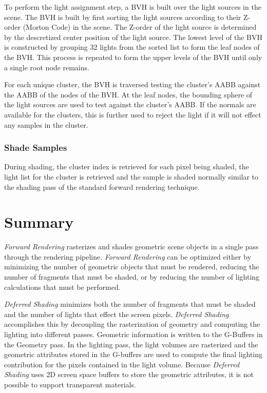 To perform the light assignment step, a BVH is built over the light sources in the scene. The BVH is built by first sorting the light sources according to their Z-order (Morton Code) in the scene. The Z-order of the light source is determined by the descretized center position of the light source. The lowest level of the BVH is constructed by grouping 32 lights from the sorted list to form the leaf nodes of the BVH. This process is repeated to form the upper levels of the BVH until only a single root node remains.

For each unique cluster, the BVH is traversed testing the cluster's AABB against the AABB of the nodes of the BVH. At the leaf nodes, the bounding sphere of the light sources are used to test against the cluster's AABB. If the normals are available for the clusters, this is further used to reject the light if it will not effect any samples in the cluster.

\subsubsection{Shade Samples}

During shading, the cluster index is retrieved for each pixel being shaded, the light list for the cluster is retrieved and the sample is shaded normally similar to the shading pass of the standard forward rendering technique.

\section{Summary}

\emph{Forward Rendering} rasterizes and shades geometric scene objects in a single pass through the rendering pipeline. \emph{Forward Rendering} can be optimized either by minimizing the number of geometric objects that must be rendered, reducing the number of fragments that must be shaded, or by reducing the number of lighting calculations that must be performed. 

\emph{Deferred Shading} minimizes both the number of fragments that must be shaded and the number of lights that effect the screen pixels. \emph{Deferred Shading} accomplishes this by decoupling the rasterization of geometry and computing the lighting into different passes. Geometric information is written to the G-Buffers in the Geometry pass. In the lighting pass, the light volumes are rasterized and the geometric attributes stored in the G-buffers are used to compute the final lighting contribution for the pixels contained in the light volume. Because \emph{Deferred Shading} uses 2D screen space buffers to store the geometric attributes, it is not possible to support transparent materials.

